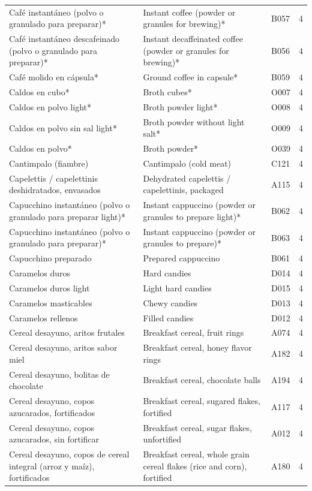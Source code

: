 {\begin{longtable}{p{4.3cm}p{5.5cm}p{1.5cm}p{0.7cm}}
Café instantáneo (polvo o granulado para preparar)* & Instant coffee (powder or granules for brewing)* & B057 & 4\\
Café instantáneo descafeinado (polvo o granulado para preparar)* & Instant decaffeinated coffee (powder or granules for brewing)* & B056 & 4\\
Café molido en cápsula* & Ground coffee in capsule* & B059 & 4\\
Caldos en cubo* & Broth cubes* & O007 & 4\\
Caldos en polvo light* & Broth powder light* & O008 & 4\\
Caldos en polvo sin sal light* & Broth powder without light salt* & O009 & 4\\
Caldos en polvo* & Broth powder* & O039 & 4\\
Cantimpalo (fiambre) & Cantimpalo (cold meat) & C121 & 4\\
Capelettis / capelettinis deshidratados, envasados & Dehydrated capelettis / capelettinis, packaged & A115 & 4\\
Capucchino instantáneo (polvo o granulado para preparar light)* & Instant cappuccino (powder or granules to prepare light)* & B062 & 4\\
Capucchino instantáneo (polvo o granulado para preparar)* & Instant cappuccino (powder or granules to prepare)* & B063 & 4\\
Capucchino preparado & Prepared cappuccino & B061 & 4\\
Caramelos duros & Hard candies & D014 & 4\\
Caramelos duros light & Light hard candies & D015 & 4\\
Caramelos masticables & Chewy candies & D013 & 4\\
Caramelos rellenos & Filled candies & D012 & 4\\
Cereal desayuno, aritos frutales & Breakfast cereal, fruit rings & A074 & 4\\
Cereal desayuno, aritos sabor miel & Breakfast cereal, honey flavor rings & A182 & 4\\
Cereal desayuno, bolitas de chocolate & Breakfast cereal, chocolate balls & A194 & 4\\
Cereal desayuno, copos azucarados, fortificados & Breakfast cereal, sugared flakes, fortified & A117 & 4\\
Cereal desayuno, copos azucarados, sin fortificar & Breakfast cereal, sugar flakes, unfortified & A012 & 4\\
Cereal desayuno, copos de cereal integral (arroz y maíz), fortificados & Breakfast cereal, whole grain cereal flakes (rice and corn), fortified & A180 & 4\\

\end{longtable}}
